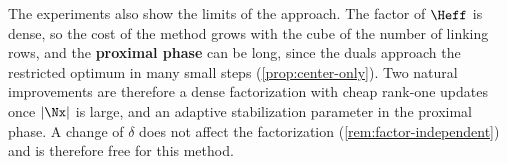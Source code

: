 The experiments also show the limits of the approach. The factor of $\Heff$ is dense, so the
cost of the method grows with the cube of the number of linking rows, and the
\textbf{proximal phase} can be long, since the duals approach the restricted optimum in many
small steps (\cref{prop:center-only}). Two natural improvements are therefore a dense
factorization with cheap rank-one updates once $|\Nx|$ is large, and an adaptive
stabilization parameter in the proximal phase. A change of $\delta$ does not affect the
factorization (\cref{rem:factor-independent}) and is therefore free for this method.
